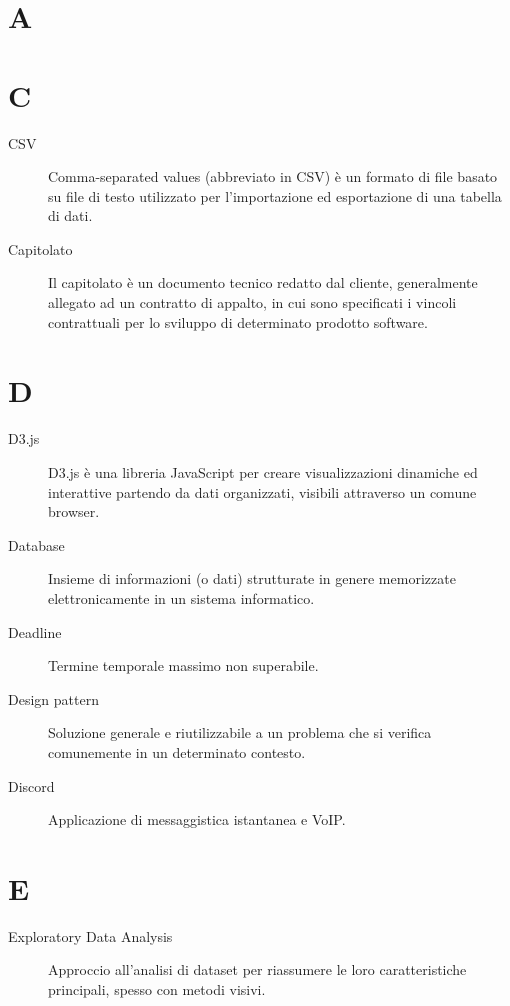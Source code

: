 \documentclass{article}
\begin{document}



\section{A}

\newpage


\section{C}
\begin{description}
  \item[CSV] Comma-separated values (abbreviato in CSV) è un formato di file basato su file di testo utilizzato per l'importazione ed esportazione di una tabella di dati.
  \item[Capitolato] Il capitolato è un documento tecnico redatto dal cliente, generalmente allegato ad un contratto di appalto, in cui sono specificati i vincoli contrattuali per lo sviluppo di determinato prodotto software.
\end{description}
\newpage


\section{D}
\begin{description}
  \item[D3.js] D3.js è una libreria JavaScript per creare visualizzazioni dinamiche ed interattive partendo da dati organizzati, visibili attraverso un comune browser.
  \item[Database] Insieme di informazioni (o dati) strutturate in genere memorizzate elettronicamente in un sistema informatico.
  \item[Deadline] Termine temporale massimo non superabile.
  \item[Design pattern] Soluzione generale e riutilizzabile a un problema che si verifica comunemente in un determinato contesto.
  \item[Discord] Applicazione di messaggistica istantanea e VoIP.
\end{description}
\newpage
\section{E}
\begin{description}
  \item[Exploratory Data Analysis] Approccio all'analisi di dataset per riassumere le loro caratteristiche principali, spesso con metodi visivi.
\end{description}
\newpage
\end{document}

